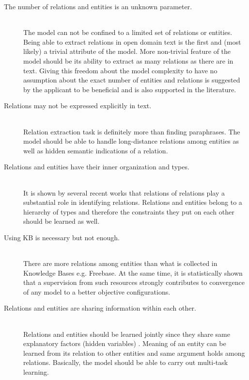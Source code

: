 \documentclass[12pt]{report}
\begin{document}
\begin{description}
  
  \item[The number of relations and entities is an unknown parameter.] \hfill \\
  The model can not be confined to a limited set of relations or entities. Being able to extract relations in
  open domain text is the first and (most likely) a trivial attribute of the model. More non-trivial feature
  of the model should be its ability to extract as many relations as there are in text. 
  Giving this freedom
  about the model complexity to have no assumption about the exact number of entities and relations
  is suggested by the applicant to be beneficial 
   and is also supported in the literature.
   \cite{Mintz2009} \cite{Yates2007}  

  \item[Relations may not be expressed explicitly in text.] \hfill \\
  Relation extraction task is definitely more than finding paraphrases. The model should be able to handle
  long-distance relations among entities as well as hidden semantic indications of a relation. \cite{Poon2009}
  


  \item[Relations and entities have their inner organization and types.] \hfill \\
  It is shown by several recent works that relations of relations play a substantial role in identifying
  relations. Relations and entities belong to a hierarchy of types and therefore the constraints they put on each other
  should be learned as well.\cite{Yao2011} \cite{Alfonseca2012} \cite{Nakashole2012a}

  \item[Using KB is necessary but not enough.] \hfill \\
  There are more relations among entities than what is collected in 
  Knowledge Bases e.g. Freebase. At the same time, it is statistically shown that a supervision
  from such resources strongly contributes to convergence of any model to a better 
  objective configurations.\cite{Yao2011} \cite{Mintz2009}

  \item[Relations and entities are sharing information within each other.] \hfill \\
  Relations and entities should be learned jointly since they share same explanatory factors (hidden variables)
  . Meaning of an entity can be learned from its relation to other entities and same argument holds among relations.
  Basically, the model should be able to carry out multi-task learning. \cite{Yao2011} 
    
\end{description}
\end{document}
